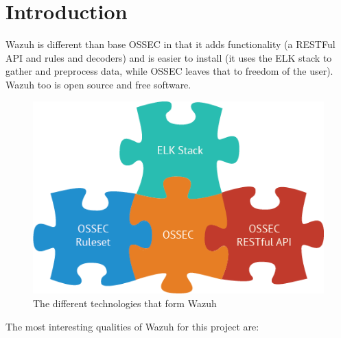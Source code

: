 
\section{Introduction}

Wazuh is different than base OSSEC in that it adds functionality (a RESTFul API and rules and decoders) and is easier to install (it uses the ELK stack to gather and preprocess data, while OSSEC leaves that to freedom of the user). Wazuh too is open source and free software.
\begin{figure}[H]
  \centering
	\includegraphics[width=\textwidth]{figuras/wazuh_stack.png}
	\caption{The different technologies that form Wazuh\cite{wazuh_stack}}
\end{figure}
\linej
The most interesting qualities of Wazuh for this project are\cite{wazuh_documentation}: %
